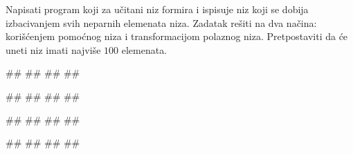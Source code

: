 \ifresenja
\begin{Answer}[ref=p.unija_presek_razlika]
\end{Answer}
\fi

\begin{Exercise}[label=p.izbacivanje_elemenata] 
Napisati program koji za učitani niz formira i ispisuje niz koji se dobija izbacivanjem svih neparnih elemenata niza. Zadatak rešiti na dva načina: korišćenjem pomoćnog niza i transformacijom polaznog niza. Pretpostaviti da će uneti niz imati najviše $100$ elemenata.  %
 
\begin{miditest}
\begin{upotreba}{1}
#\naslovInt#
##
##
##
\end{upotreba}
\end{miditest}
\begin{miditest}
\begin{upotreba}{2}
#\naslovInt#
##
##
##
\end{upotreba}
\end{miditest}

\begin{miditest}
\begin{upotreba}{3}
#\naslovInt#
##
##
#\izlaz{}#
\end{upotreba}
\end{miditest}

\begin{maxitest}
\begin{upotreba}{4}
#\naslovInt#
##
##
##
\end{upotreba}
\end{maxitest}
\end{Exercise}

\ifresenja
\begin{Answer}[ref=p.izbacivanje_elemenata]
\end{Answer}
\fi

